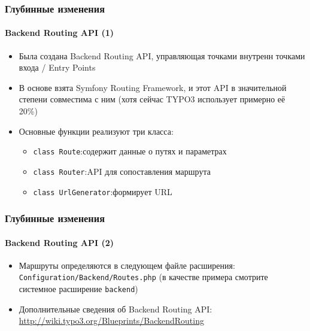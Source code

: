 \begin{frame}[fragile]
	\frametitle{Глубинные изменения}
	\framesubtitle{Backend Routing API (1)}

	\begin{itemize}
		\item Была создана Backend Routing API, управляющая точками внутренн точками входа / Entry Points
		\item В основе взята Symfony Routing Framework, и этот API в значительной степени совместима с ним\newline
			\small(хотя сейчас TYPO3 использует примерно её 20\%)\normalsize

		\item Основные функции реализуют три класса:
			\begin{itemize}
				\item \texttt{class Route}:\tabto{3.6cm}содержит данные о путях и параметрах
				\item \texttt{class Router}:\tabto{3.6cm}API для сопоставления маршрута
				\item \texttt{class UrlGenerator}:\tabto{3.6cm}формирует URL
			\end{itemize}
	\end{itemize}

\end{frame}

\begin{frame}[fragile]
	\frametitle{Глубинные изменения}
	\framesubtitle{Backend Routing API (2)}

	\begin{itemize}

		\item Маршруты определяются в следующем файле расширения:
			\texttt{Configuration/Backend/Routes.php}\newline
			(в качестве примера смотрите системное расширение \texttt{backend})

		\item Дополнительные сведения об Backend Routing API:\newline
			\small\url{http://wiki.typo3.org/Blueprints/BackendRouting}\normalsize

	\end{itemize}

\end{frame}

